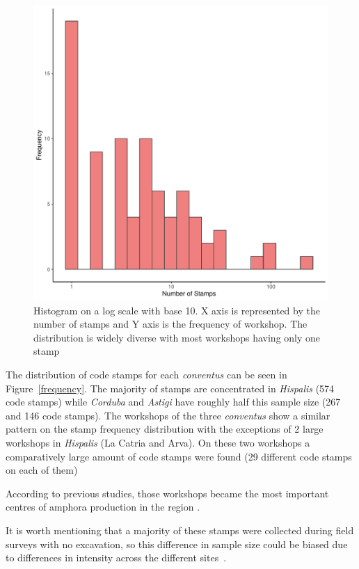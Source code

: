 \documentclass[review]{elsarticle}
\begin{document}
\begin{figure}[htp]
	\centering
\includegraphics[width=\linewidth]{figs/frequencystamp.pdf}
\caption{Histogram on a log scale with base 10. X axis is represented by the number of stamps and Y axis is the frequency of workshop. The distribution is widely diverse with most workshops having only one stamp}
\label{stamps}
\end{figure} 


The distribution of code stamps for each \textit{conventus} can be seen in Figure~\ref{frequency}. The majority of stamps are concentrated in \textit{Hispalis} (574 code stamps) while \textit{Corduba} and \textit{Astigi} have roughly half this sample size (267 and 146 code stamps). The workshops of the three \textit{conventus} show a similar pattern on the stamp frequency distribution with the exceptions of 2 large workshops in \textit{Hispalis} (La Catria and Arva). On these two workshops a comparatively large amount of code stamps were found (29 different code stamps on each of them)

According to previous studies, those workshops became the most important centres of amphora production in the region \citep{rodriguez_economioleicola_1977,
arva_1997}.

It is worth mentioning that a majority of these stamps were collected during field surveys with no excavation, so this difference in sample size could be biased due to differences in intensity across the different sites~\citep{arva_1997}.
 
\end{document}
